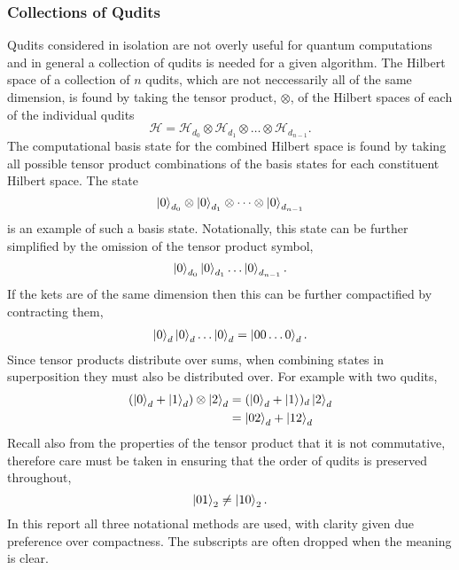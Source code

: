 \subsubsection{Collections of Qudits}
Qudits considered in isolation are not overly useful for quantum computations and in general a collection of qudits is needed for a given algorithm.
The Hilbert space of a collection of $n$ qudits, which are not neccessarily all of the same dimension, is found by taking the tensor product, $\otimes$, of the Hilbert spaces of each of the individual qudits
\begin{equation}
    \mathcal{H} = \mathcal{H}_{d_0} \otimes \mathcal{H}_{d_1} \otimes \dots \otimes \mathcal{H}_{d_{n-1}}.
\end{equation}
The computational basis state for the combined Hilbert space is found by taking all possible tensor product combinations of the basis states for each constituent Hilbert space.
The state 
\begin{equation}
    \ket{0}_{d_0}\otimes\ket{0}_{d_1}\otimes\dots\otimes\ket{0}_{d_{n-1}}
\end{equation}
is an example of such a basis state.
Notationally, this state can be further simplified by the omission of the tensor product symbol,
\begin{equation}
    \ket{0}_{d_0}\ket{0}_{d_1}\dots\ket{0}_{d_{n-1}}.
\end{equation}
If the kets are of the same dimension then this can be further compactified by contracting them,
\begin{align}
    \ket{0}_{d}\ket{0}_{d}\dots\ket{0}_{d} = \ket{00\dots0}_d.
\end{align}
Since tensor products distribute over sums, when combining states in superposition they must also be distributed over.
For example with two qudits,
\begin{align}
    (\ket{0}_d + \ket{1}_d)\otimes\ket{2}_d &= (\ket{0}_d + \ket{1})_d\ket{2}_d\\
    &= \ket{02}_d + \ket{12}_d
\end{align}
Recall also from the properties of the tensor product that it is not commutative, therefore care must be taken in ensuring that the order of qudits is preserved throughout,
\begin{equation}
    \ket{01}_2 \neq \ket{10}_2.
\end{equation}
In this report all three notational methods are used, with clarity given due preference over compactness.
The subscripts are often dropped when the meaning is clear.

